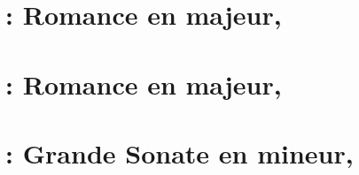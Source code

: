\section{\ifChrono \Schumann{}~: \fi
Romance en \kF \Sharp majeur,  }
\label{\thesection}

\begin{workitemize}
 \item{}
 \begin{perfitemize}
  \item{}
 \end{perfitemize}
\end{workitemize}

\section{\ifChrono \Schumann{}~: \fi
Romance en \kB majeur,  }
\label{\thesection}

\begin{workitemize}
 \item{}
 \begin{perfitemize}
  \item{}
 \end{perfitemize}
\end{workitemize}

\section{\ifChrono \Schumann{}~: \fi
Grande Sonate  en \kF \Sharp mineur, }
\label{\thesection}

